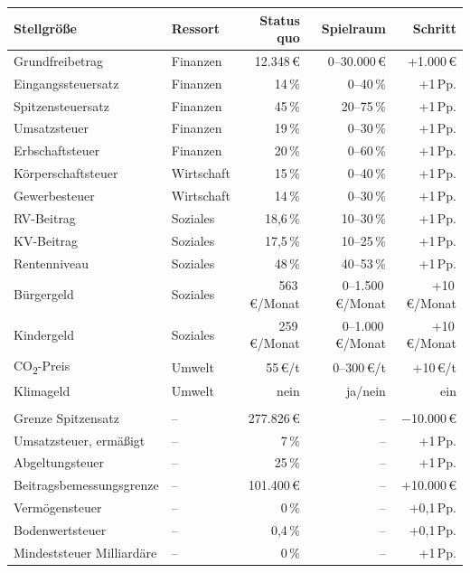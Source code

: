 \begin{tabular}{@{}llrrr@{}}
\toprule
Stellgröße & Ressort & Status quo & Spielraum & Schritt \\
\midrule
Grundfreibetrag & Finanzen & 12.348\,\euro{} & 0--30.000\,\euro{} & +1.000\,\euro{} \\
Eingangssteuersatz & Finanzen & 14\,\% & 0--40\,\% & +1\,Pp. \\
Spitzensteuersatz & Finanzen & 45\,\% & 20--75\,\% & +1\,Pp. \\
Umsatzsteuer & Finanzen & 19\,\% & 0--30\,\% & +1\,Pp. \\
Erbschaftsteuer & Finanzen & 20\,\% & 0--60\,\% & +1\,Pp. \\
Körperschaftsteuer & Wirtschaft & 15\,\% & 0--40\,\% & +1\,Pp. \\
Gewerbesteuer & Wirtschaft & 14\,\% & 0--30\,\% & +1\,Pp. \\
RV-Beitrag & Soziales & 18,6\,\% & 10--30\,\% & +1\,Pp. \\
KV-Beitrag & Soziales & 17,5\,\% & 10--25\,\% & +1\,Pp. \\
Rentenniveau & Soziales & 48\,\% & 40--53\,\% & +1\,Pp. \\
Bürgergeld & Soziales & 563\,\euro{}/Monat & 0--1.500\,\euro{}/Monat & +10\,\euro{}/Monat \\
Kindergeld & Soziales & 259\,\euro{}/Monat & 0--1.000\,\euro{}/Monat & +10\,\euro{}/Monat \\
CO\textsubscript{2}-Preis & Umwelt & 55\,\euro{}/t & 0--300\,\euro{}/t & +10\,\euro{}/t \\
Klimageld & Umwelt & nein & ja/nein & ein \\
\addlinespace
\multicolumn{5}{@{}l}{\emph{Weitere Stellgrößen}} \\
Grenze Spitzensatz & -- & 277.826\,\euro{} & -- & $-$10.000\,\euro{} \\
Umsatzsteuer, ermäßigt & -- & 7\,\% & -- & +1\,Pp. \\
Abgeltungsteuer & -- & 25\,\% & -- & +1\,Pp. \\
Beitragsbemessungsgrenze & -- & 101.400\,\euro{} & -- & +10.000\,\euro{} \\
Vermögensteuer & -- & 0\,\% & -- & +0,1\,Pp. \\
Bodenwertsteuer & -- & 0,4\,\% & -- & +0,1\,Pp. \\
Mindeststeuer Milliardäre & -- & 0\,\% & -- & +1\,Pp. \\
\bottomrule
\end{tabular}
